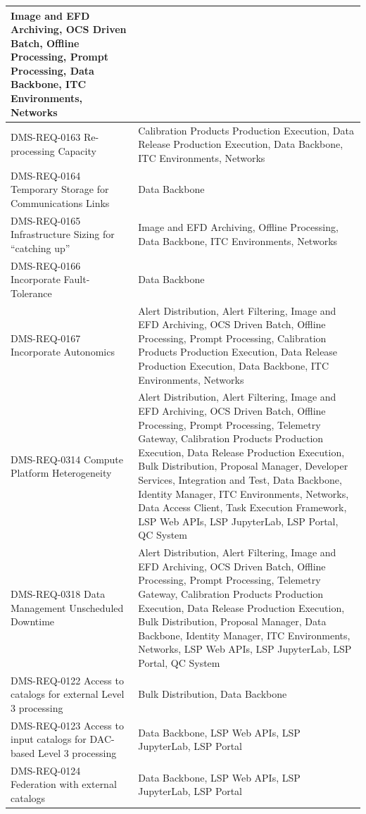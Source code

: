 \documentclass[DM,lsstdraft,toc]{lsstdoc}
\begin{document}
\begin{xtabular}{|p{0.4\textwidth}|p{0.55\textwidth}|}
Image and EFD Archiving, OCS Driven Batch, Offline Processing, Prompt
Processing, Data Backbone, ITC Environments, Networks\\ \hline
DMS-REQ-0163 Re-processing Capacity & Calibration Products Production
Execution, Data Release Production Execution, Data Backbone, ITC
Environments, Networks\\ \hline
DMS-REQ-0164 Temporary Storage for Communications Links & Data
Backbone\\ \hline
DMS-REQ-0165 Infrastructure Sizing for ``catching up'' & Image and EFD
Archiving, Offline Processing, Data Backbone, ITC Environments,
Networks\\ \hline
DMS-REQ-0166 Incorporate Fault-Tolerance & Data Backbone\\ \hline
DMS-REQ-0167 Incorporate Autonomics & Alert Distribution, Alert
Filtering, Image and EFD Archiving, OCS Driven Batch, Offline
Processing, Prompt Processing, Calibration Products Production
Execution, Data Release Production Execution, Data Backbone, ITC
Environments, Networks\\ \hline
DMS-REQ-0314 Compute Platform Heterogeneity & Alert Distribution, Alert
Filtering, Image and EFD Archiving, OCS Driven Batch, Offline
Processing, Prompt Processing, Telemetry Gateway, Calibration Products
Production Execution, Data Release Production Execution, Bulk
Distribution, Proposal Manager, Developer Services, Integration and
Test, Data Backbone, Identity Manager, ITC Environments, Networks, Data
Access Client, Task Execution Framework, LSP Web APIs, LSP
JupyterLab, LSP Portal, QC System\\ \hline
DMS-REQ-0318 Data Management Unscheduled Downtime & Alert Distribution,
Alert Filtering, Image and EFD Archiving, OCS Driven Batch, Offline
Processing, Prompt Processing, Telemetry Gateway, Calibration Products
Production Execution, Data Release Production Execution, Bulk
Distribution, Proposal Manager, Data Backbone, Identity Manager, ITC
Environments, Networks, LSP Web APIs, LSP JupyterLab, LSP Portal, QC
System\\ \hline
DMS-REQ-0122 Access to catalogs for external Level 3 processing & Bulk
Distribution, Data Backbone\\ \hline
DMS-REQ-0123 Access to input catalogs for DAC-based Level 3 processing &
Data Backbone, LSP Web APIs, LSP JupyterLab, LSP
Portal\\ \hline
DMS-REQ-0124 Federation with external catalogs & Data Backbone, LSP Web APIs,
LSP JupyterLab, LSP Portal\\ \hline

\end{xtabular}
\end{document}
